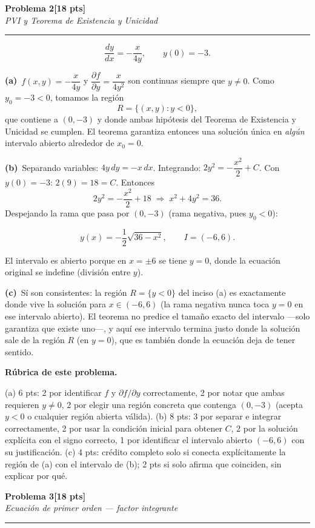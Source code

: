 \documentclass[11pt,letterpaper]{article}
\newcommand{\problema}[3]{%
  \bigskip\bigskip\noindent
  {\Large\textbf{Problema #1}}\hfill\textbf{[#2 pts]}\\[3pt]
  {\small\itshape #3}\par
  \vspace{2pt}\hrule\vspace{8pt}
}
\newcommand{\subparte}[2]{%
  \medskip\noindent\textbf{(#1}\ #2\par\smallskip
}
\newenvironment{resultado}
  {\begin{mdframed}[linecolor=black,linewidth=0.6pt,
    innerleftmargin=6pt,innerrightmargin=6pt,innertopmargin=4pt,innerbottommargin=4pt]
   \bfseries}
  {\end{mdframed}}
\newenvironment{rubrica}{%
  \begin{mdframed}[linecolor=black,linewidth=0.6pt,
    innerleftmargin=8pt,innerrightmargin=8pt,innertopmargin=5pt,innerbottommargin=5pt]
  \small\textbf{Rúbrica de este problema.}\par\smallskip
}{\end{mdframed}}
\begin{document}
\newpage
\problema{2}{18}{PVI y Teorema de Existencia y Unicidad}

\[
\frac{dy}{dx} = -\frac{x}{4y}, \qquad y(0)=-3.
\]

\subparte{a)}{$f(x,y) = -\dfrac{x}{4y}$ y $\dfrac{\partial f}{\partial y} = \dfrac{x}{4y^2}$ son continuas siempre que $y \neq 0$. Como $y_0 = -3 < 0$, tomamos la región
\[
R = \{(x,y) : y < 0\},
\]
que contiene a $(0,-3)$ y donde ambas hipótesis del Teorema de Existencia y Unicidad se cumplen. El teorema garantiza entonces una solución única en \emph{algún} intervalo abierto alrededor de $x_0=0$.}

\subparte{b)}{Separando variables: $4y\,dy = -x\,dx$. Integrando: $2y^2 = -\dfrac{x^2}{2} + C$. Con $y(0)=-3$: $2(9) = 18 = C$. Entonces
\[
2y^2 = -\frac{x^2}{2} + 18 \;\Longrightarrow\; x^2 + 4y^2 = 36.
\]
Despejando la rama que pasa por $(0,-3)$ (rama negativa, pues $y_0<0$):
\begin{resultado}
\[
y(x) = -\frac{1}{2}\sqrt{36-x^2}, \qquad I = (-6,6).
\]
\end{resultado}
El intervalo es abierto porque en $x=\pm 6$ se tiene $y=0$, donde la ecuación original se indefine (división entre $y$).}

\subparte{c)}{Sí son consistentes: la región $R=\{y<0\}$ del inciso (a) es exactamente donde vive la solución para $x\in(-6,6)$ (la rama negativa nunca toca $y=0$ en ese intervalo abierto). El teorema no predice el tamaño exacto del intervalo —solo garantiza que existe uno—, y aquí ese intervalo termina justo donde la solución sale de la región $R$ (en $y=0$), que es también donde la ecuación deja de tener sentido.}

\begin{rubrica}
(a) 6 pts: 2 por identificar $f$ y $\partial f/\partial y$ correctamente, 2 por notar que ambas requieren $y\neq0$, 2 por elegir una región concreta que contenga $(0,-3)$ (acepta $y<0$ o cualquier región abierta válida). (b) 8 pts: 3 por separar e integrar correctamente, 2 por usar la condición inicial para obtener $C$, 2 por la solución explícita con el signo correcto, 1 por identificar el intervalo abierto $(-6,6)$ con su justificación. (c) 4 pts: crédito completo solo si conecta explícitamente la región de (a) con el intervalo de (b); 2 pts si solo afirma que coinciden, sin explicar por qué.
\end{rubrica}

\problema{3}{18}{Ecuación de primer orden — factor integrante}
\end{document}
